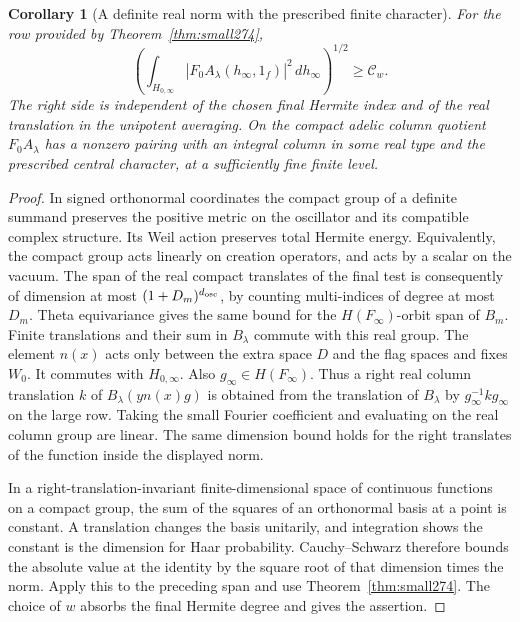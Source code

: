 \documentclass[a4paper,11pt]{article}
\newtheorem{corollary}[proposition]{Corollary}
\theoremstyle{definition}
\theoremstyle{remark}
\numberwithin{equation}{section}
\begin{document}
\begin{corollary}[A definite real norm with the prescribed finite character]\leavevmode
\label{cor:real274}
For the row provided by Theorem~\ref{thm:small274},
\[
    \left(\int_{H_{0,\infty}}
        |F_0 A_\lambda(h_\infty,1_f)|^2\,dh_\infty\right)^{1/2}
                                    \ge\mathcal C_w .
\]
The right side is independent of the chosen final Hermite
index and of the real translation in the unipotent averaging.
On the compact adelic column quotient \(F_0A_\lambda\) has a
nonzero pairing with an integral column in some real type
and the prescribed central character, at a sufficiently fine
finite level.
\end{corollary}
\begin{proof}
In signed orthonormal coordinates the compact group of a
definite summand preserves the positive metric on the
oscillator and its compatible complex structure. Its Weil
action preserves total Hermite energy. Equivalently, the
compact group acts linearly on creation operators, and acts
by a scalar on the vacuum. The span of the real compact
translates of the final test is consequently of dimension
at most \((1+D_m)^{d_{\rm osc}}\), by counting multi-indices
of degree at most \(D_m\). Theta equivariance gives the same
bound for the \(H(F_\infty)\)-orbit span of \(B_m\). Finite
translations and their sum in \(B_\lambda\) commute with
this real group. The element \(n(x)\) acts only between
the extra space \(D\) and the flag spaces and fixes \(W_0\).
It commutes with \(H_{0,\infty}\). Also \(g_\infty\in H(F_\infty)\).
Thus a right real column translation \(k\) of
\(B_\lambda(y n(x)g)\) is obtained from the translation
of \(B_\lambda\) by \(g_\infty^{-1}kg_\infty\) on the large
row. Taking the small Fourier coefficient and evaluating
on the real column group are linear. The same dimension
bound holds for the right translates of the function inside
the displayed norm.

In a right-translation-invariant finite-dimensional space
of continuous functions on a compact group, the sum of the
squares of an orthonormal basis at a point is constant. A
translation changes the basis unitarily, and integration
shows the constant is the dimension for Haar probability.
Cauchy--Schwarz therefore bounds the absolute value at the
identity by the square root of that dimension times the
norm. Apply this to the preceding span and use
Theorem~\ref{thm:small274}. The choice of \(w\) absorbs the
final Hermite degree and gives the assertion.


\end{proof}
\end{document}
